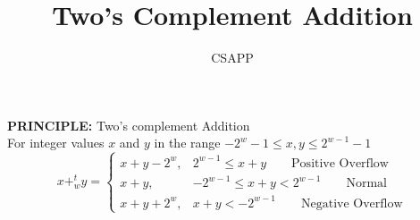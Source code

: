 \documentclass{article}
\title{Two's Complement Addition}
\author{CSAPP}
\begin{document}
    \maketitle
    \begin{flushleft}
        \textbf{\small PRINCIPLE:} Two's complement Addition\\
        For integer values $x$ and $y$ in the range $-2^w-1 \leq x, y \leq 2^{w-1} -1$
        \[
            x+^t_w y = \begin{cases}
                x+y-2^w, & 2^{w-1} \leq x+ y  \qquad  \text{Positive Overflow}\\
                x+y,     & -2^{w-1} \leq x+y < 2^{w-1} \qquad \text{Normal}\\
                x+y+2^w, & x+y < -2^{w-1}   \qquad \text{Negative Overflow}           
            \end{cases}
        \]
    \end{flushleft}
\end{document}
